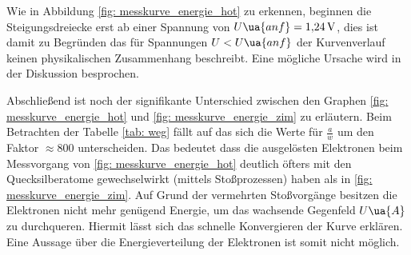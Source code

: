 Wie in Abbildung \ref{fig: messkurve_energie_hot} zu erkennen, beginnen die Steigungsdreiecke erst ab
einer Spannung von $U\ua{anf}=\SI{1.24}{\volt}$, dies ist damit zu Begründen das für Spannungen $U<U\ua{anf}$
der Kurvenverlauf keinen physikalischen Zusammenhang beschreibt. Eine mögliche Ursache wird
in der Diskussion besprochen.

Abschließend ist noch der signifikante Unterschied zwischen den Graphen \ref{fig: messkurve_energie_hot} und \ref{fig: messkurve_energie_zim}
zu erläutern. Beim Betrachten der Tabelle \ref{tab: weg} fällt auf das sich die Werte für $\frac{a}{w}$ um den Faktor $\approx 800$ unterscheiden.
Das bedeutet dass die ausgelösten Elektronen beim Messvorgang von \ref{fig: messkurve_energie_hot} deutlich öfters mit den
Quecksilberatome gewechselwirkt (mittels Stoßprozessen) haben als in \ref{fig: messkurve_energie_zim}. Auf Grund der vermehrten Stoßvorgänge besitzen die Elektronen nicht mehr genügend
Energie, um das wachsende Gegenfeld $U\ua{A}$ zu durchqueren. Hiermit lässt sich das schnelle Konvergieren der Kurve erklären.
Eine Aussage über die Energieverteilung der Elektronen ist somit nicht möglich.
\FloatBarrier
